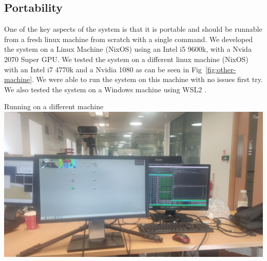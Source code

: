 \subsection{Portability}
One of the key aspects of the system is that it is portable and should be runnable from a fresh linux machine from scratch with a single command. We developed the system on a Linux Machine (NixOS) using an Intel i5 9600k, with a Nvida 2070 Super GPU. We tested the system on a different linux machine (NixOS) with an Intel i7 4770k and a Nvidia 1080 as can be seen in Fig~\ref{fig:other-machine}. We were able to run the system on this machine with no issues first try. We also tested the system on a Windows machine using WSL2 \todo. 

\begin{figureBox}[label={fig:other-machine}, width=0.7\linewidth]{Running on a different machine}
	\includegraphics[width = 1.0\linewidth]{./evaluation/figures/other-device.jpeg}
\end{figureBox}